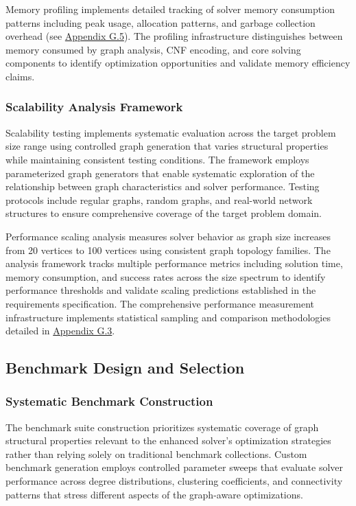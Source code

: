 Memory profiling implements detailed tracking of solver memory consumption patterns including peak usage, allocation patterns, and garbage collection overhead (see \hyperref[appendix:memory-profiling-testing]{Appendix G.5}). The profiling infrastructure distinguishes between memory consumed by graph analysis, CNF encoding, and core solving components to identify optimization opportunities and validate memory efficiency claims.

\subsubsection{Scalability Analysis Framework}
Scalability testing implements systematic evaluation across the target problem size range using controlled graph generation that varies structural properties while maintaining consistent testing conditions. The framework employs parameterized graph generators that enable systematic exploration of the relationship between graph characteristics and solver performance. Testing protocols include regular graphs, random graphs, and real-world network structures to ensure comprehensive coverage of the target problem domain.

Performance scaling analysis measures solver behavior as graph size increases from 20 vertices to 100 vertices using consistent graph topology families. The analysis framework tracks multiple performance metrics including solution time, memory consumption, and success rates across the size spectrum to identify performance thresholds and validate scaling predictions established in the requirements specification. The comprehensive performance measurement infrastructure implements statistical sampling and comparison methodologies detailed in \hyperref[appendix:performance-measurement]{Appendix G.3}.

\subsection{Benchmark Design and Selection}

\subsubsection{Systematic Benchmark Construction}
The benchmark suite construction prioritizes systematic coverage of graph structural properties relevant to the enhanced solver's optimization strategies rather than relying solely on traditional benchmark collections. Custom benchmark generation employs controlled parameter sweeps that evaluate solver performance across degree distributions, clustering coefficients, and connectivity patterns that stress different aspects of the graph-aware optimizations.

